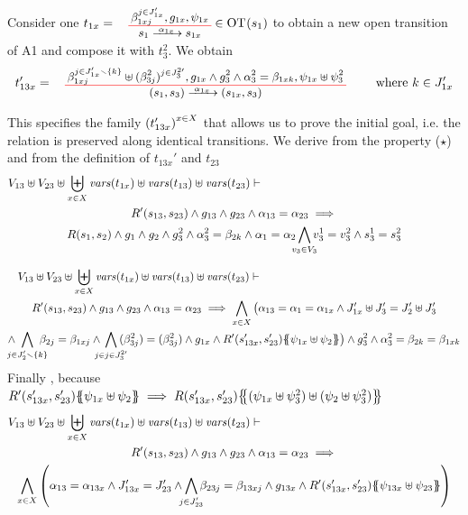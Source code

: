 \documentclass[runningheads]{llncs}
\begin{document}
\begin{enumerate}
Consider one $t_{1x}=\OT{s_1}{s_{1x}}{\alpha_{1x}}{\beta_{1xj}^{j \in J'_{1x}}}{g_{1x}}{\psi_{1x}}\in \fOT{s_1}$ to obtain a new open transition of A1 and compose it with $t_3^2$.
We obtain 
\[
t_{13x}' = \OT{\mpar{s_1, s_3}}{\mpar{s_{1x}, {s_3}}}{\alpha_{1x}}{\beta_{1xj}^{j \in J'_{1x} \setminus \{k\}} \uplus  {(\beta^2_{3j})^{j \in J^{2 \prime}_3} }}{g_{1x} \wedge g^2_3 \wedge \alpha^2_3 = \beta_{1xk}}{\psi_{1x} \uplus \psi^2_3} \qquad \text{ where } k \in J'_{1x} 
\]

This specifies the family ${\left(t_{13x}'\right)}^{x\in X}$
that allows us to prove the initial goal, i.e. the relation is preserved along identical transitions. We derive from the property ($\star$) and from the definition of $t_{13x}'$ and $t_{23}$
\begin{multline*}
  V_{13} \uplus V_{23} \uplus  \biguplus_{x\in X}\fvars{t_{1x}}  \uplus \fvars{t_{13}} \uplus \fvars{t_{23}} 
\vdash \hspace{6cm}\\  R'\mpar{s_{13}, s_{23}} \wedge 	g_{13} \wedge g_{23} \wedge \alpha_{13} = \alpha_{23} 
\implies \\
 R\mpar{s_{1}, s_{2}} \wedge 	g_{1} \wedge g_2 \wedge g^2_3 \wedge \alpha^2_3 = \beta_{2k} \wedge \alpha_{1} = \alpha_{2} \bigwedge_\subbox{v_3\in V_3}
 v^1_3=v^2_3\wedge s^1_3 = s^2_3
\end{multline*}

\begin{multline*}
  V_{13} \uplus V_{23} \uplus  \biguplus_{x\in X}\fvars{t_{1x}}  \uplus \fvars{t_{13}} \uplus \fvars{t_{23}} 
\vdash \hspace{6cm}\\  R'\mpar{s_{13}, s_{23}} \wedge 	g_{13} \wedge g_{23} \wedge \alpha_{13} = \alpha_{23} 
\implies 
\bigwedge_{x\in X}
\big(
 \alpha_{13}=\alpha_1=\alpha_{1 x}  \land J'_{1x}\uplus J'_3= J'_2\uplus J'_3\\
 \land \bigwedge_\subbox{j \in J'_2 \setminus\{k\} } \beta_{2j} = \beta_{1xj}
 \land \bigwedge_\subbox{j \in {j \in J^{2 \prime}_3} }  (\beta^2_{3j}) = (\beta^2_{3j}) \land g_{1 x}\land
 R'\mpar{s'_{1 3x}, s'_{23}}\psubst{\psi_{1 x} \uplus \psi_2}\big)
\wedge g^2_3 \wedge \alpha^2_3 = \beta_{2k} = \beta_{1xk}
\end{multline*}
Finally , because $R'\mpar{s'_{1 3x}, s'_{23}}\psubst{\psi_{1 x} \uplus \psi_2} \implies R\mpar{s'_{1 3x}, s'_{23}}\psubst{(\psi_{1 x} \uplus \psi^2_3) \uplus (\psi_2 \uplus \psi^2_3)}$
\begin{multline*}
  V_{13} \uplus V_{23} \uplus  \biguplus_{x\in X}\fvars{t_{1x}}  \uplus \fvars{t_{13}} \uplus \fvars{t_{23}} 
\vdash \hspace{6cm}\\  R'\mpar{s_{13}, s_{23}} \wedge 	g_{13} \wedge g_{23} \wedge \alpha_{13} = \alpha_{23} 
\implies \\
\bigwedge_{x\in X}
\mpar{
 \alpha_{13}=\alpha_{1 3x} \land
J'_{13x}  = J'_{23}  \land \bigwedge_\subbox{j \in  J'_{23}} \beta_{23j} = \beta_{13xj}\land g_{1 3x} \land
 R'\mpar{s'_{1 3x}, s'_{23}}\psubst{\psi_{1 3x} \uplus \psi_{23}}}
\end{multline*}


\end{enumerate}
\end{document}
